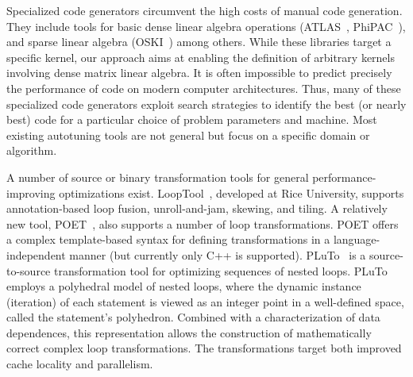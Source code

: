 \documentclass[runningheads]{llncs}
\begin{document}
Specialized code generators circumvent the high costs of manual code
generation. They include tools for basic dense linear algebra operations
(ATLAS~\cite{WN147}, PhiPAC~\cite{bilmes97optimizing}),
and sparse linear algebra (OSKI~\cite{vuduc05})
%
among others.  While these libraries target a specific kernel, our approach aims 
at enabling the definition of arbitrary kernels involving dense matrix linear algebra.
It is often impossible to predict precisely the performance of code
on modern computer architectures. Thus, many of these specialized code
generators exploit search strategies to identify the best (or nearly best)
code for a particular choice of problem parameters and machine. Most existing
autotuning tools are not general but focus on a specific domain or algorithm.


A number of source or binary transformation tools for general
performance-improving optimizations exist. LoopTool~\cite{LoopTool},
developed at Rice University, supports annotation-based loop fusion,
unroll-and-jam, skewing, and tiling.  A relatively new tool, POET~\cite{POET},
also supports a number of loop transformations. POET offers a complex
template-based syntax for defining transformations in a language-independent
manner (but currently only C++ is supported). 
PLuTo~\cite{Pluto}
is a source-to-source transformation tool for
optimizing sequences of nested loops. PLuTo employs a polyhedral model of
nested loops, where the dynamic instance (iteration) of each statement is
viewed as an integer point in a well-defined space, called the statement's
polyhedron. Combined with a characterization of data dependences, this
representation allows the construction of mathematically correct complex loop
transformations. The transformations target both improved cache locality and
parallelism.
\end{document}
